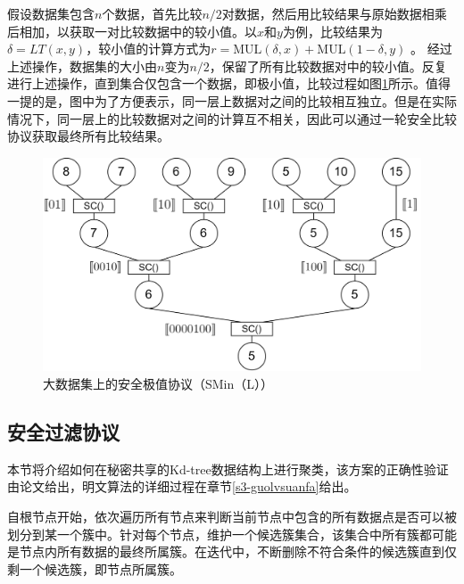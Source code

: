 假设数据集包含$n$个数据，首先比较$n/2$对数据，然后用比较结果与原始数据相乘后相加，以获取一对比较数据中的较小值。以$x$和$y$为例，比较结果为$\delta = LT(x,y) $，较小值的计算方式为$r=\text{MUL}(\delta, x) + \text{MUL}(1-\delta, y)$ 。
经过上述操作，数据集的大小由$n$变为$n/2$，保留了所有比较数据对中的较小值。反复进行上述操作，直到集合仅包含一个数据，即极小值，比较过程如图\ref{sminl}所示。值得一提的是，图中为了方便表示，同一层上数据对之间的比较相互独立。但是在实际情况下，同一层上的比较数据对之间的计算互不相关，因此可以通过一轮安全比较协议获取最终所有比较结果。

\begin{figure}[htbp]
	\centering
	\includegraphics[scale=0.08]{img/fig1.png}%
	\caption{大数据集上的安全极值协议（SMin（L））}
	\label{sminl}
\end{figure}


\subsection{安全过滤协议}
本节将介绍如何在秘密共享的Kd-tree数据结构上进行聚类，该方案的正确性验证由论文\cite{kanungo2002efficient}给出，明文算法的详细过程在章节\ref{s3-guolvsuanfa}给出。

自根节点开始，依次遍历所有节点来判断当前节点中包含的所有数据点是否可以被划分到某一个簇中。针对每个节点，维护一个候选簇集合，该集合中所有簇都可能是节点内所有数据的最终所属簇。在迭代中，不断删除不符合条件的候选簇直到仅剩一个候选簇，即节点所属簇。

